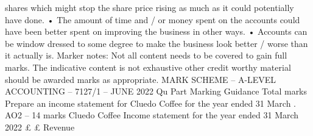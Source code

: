 \documentclass{article}
\begin{document}
shares which might stop the share price rising as much as it could potentially have done. \newline
• The amount of time and / or money spent on the accounts could have been better spent on improving \newline
the business in other ways. \newline
• Accounts can be window dressed to some degree to make the business look better / worse than it \newline
actually is. \newline
 \newline
Marker notes: \newline
 \newline
Not all content needs to be covered to gain full marks. \newline
 \newline
The indicative content is not exhaustive other credit worthy material should be awarded marks as \newline
appropriate. \newline
 \newline
 \newline
MARK SCHEME – A-LEVEL ACCOUNTING – 7127/1 – JUNE 2022  \newline
Qu \newline
Part \newline
Marking Guidance \newline
Total \newline
marks   \newline
Prepare an income statement for Cluedo Coffee for the year ended 31 March .  \newline
 \newline
AO2 – 14 marks \newline
 \newline
Cluedo Coffee \newline
Income statement for the year ended 31 March 2022  \newline
 \newline
   £ \newline
 \newline
    £ \newline
 \newline
Revenue \newline
\end{document}
